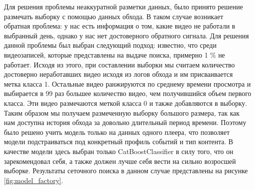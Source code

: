 Для решения проблемы неаккуратной разметки данных, было принято решение размечать выборку с помощью данных обхода. В таком случае возникает обратная проблема: у нас есть информация о том, какие видео не работали в выбранный день, однако у нас нет достоверного обратного сигнала. Для решения данной проблемы был выбран следующий подход: известно, что среди видеозаписей, которые представлены на выдаче поиска, примерно 1 \% не работает. Исходя из этого, при составлении выборки мы считаем количество достоверно неработавших видео исходя из логов обхода и им присваивается метка класса 1. Остальные видео ранжируются по среднему времени просмотра и выбирается в 99 раз большее количество видео, чем получившийся объем первого класса. Эти видео размечаются меткой класса 0 и также добавляются в выборку. Таким образом мы получаем размеченную выборку большого размера, так как нам доступна история обхода за довольно длительный период времени. Поэтому было решено учить модель только на данных одного плеера, что позволяет модели подстраиваться под конкретный профиль событий и тип контента. В качестве модели здесь выбран только CatBoostClassifier в силу того, что он зарекомендовал себя, а также должен лучше себя вести на сильно возросшей выборке. Результаты сеточного поиска в данном случае представлены на рисунке \ref{fig:model_factory}.

